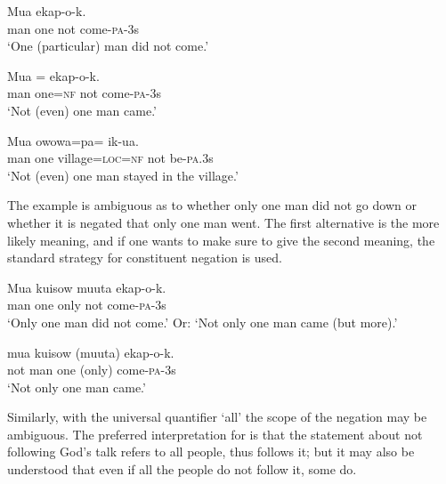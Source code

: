 \ea%
\label{ex:6:x1142}
\gll Mua      ekap-o-k. \\
man  one  not  come-\textsc{pa}-3s\\
\glt `One (particular) man did not come.'
\z

\ea%
\label{ex:6:x1143}
\gll Mua  =    ekap-o-k. \\
man  one=\textsc{nf}  not  come-\textsc{pa}-3s\\
\glt `Not (even) one man came.'
\z

\ea%
\label{ex:6:x1147}
\gll Mua    owowa=pa=    ik-ua. \\
man  one  village=\textsc{loc}=\textsc{nf}  not  be-\textsc{pa}.3s\\
\glt `Not (even) one man stayed in the village.'
\z

The example  is ambiguous as to whether only one man did not go down or whether it is negated that only one man went. The first alternative is the more likely meaning, and if one wants to make sure to give the second meaning, the standard strategy for constituent negation  is used.

\ea%
\label{ex:6:x1145}
\gll Mua  kuisow  muuta    ekap-o-k. \\
man  one  only  not  come-\textsc{pa}-3s\\
\glt `Only one man did not come.' Or: `Not only one man came (but more).'
\z

\ea%
\label{ex:6:x1144}
\gll {}  mua  kuisow  (muuta)  ekap-o-k. \\
not  man  one  (only)  come-\textsc{pa}-3s\\
\glt `Not only one man came.'
\z

Similarly, with the universal quantifier  `all' the scope of the negation may be ambiguous. The preferred interpretation for  is that the statement about not following God's talk refers to all people, thus  follows it; but it may also be understood that even if all the people do not follow it, some do.

